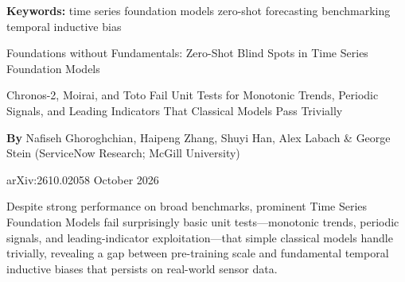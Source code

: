 \documentclass[10pt,twocolumn]{article}
\begin{document}
\setlength{\parindent}{0pt}
\setlength{\parskip}{4pt}

{\small\color{keywordgray}\textbf{Keywords:}
  time series foundation models \textbullet{}
  zero-shot forecasting \textbullet{}
  benchmarking \textbullet{}
  temporal inductive bias}\par\vspace{4pt}

{\LARGE\bfseries\raggedright
  Foundations without Fundamentals: Zero-Shot Blind Spots in Time Series Foundation Models}\par\vspace{4pt}

{\large\itshape\raggedright
  Chronos-2, Moirai, and Toto Fail Unit Tests for Monotonic Trends, Periodic Signals,
  and Leading Indicators That Classical Models Pass Trivially}\par\vspace{6pt}

{\small\textbf{By} Nafiseh Ghoroghchian, Haipeng Zhang, Shuyi Han,
  Alex Labach \& George Stein (ServiceNow Research; McGill University)}\par\vspace{2pt}

{\small\color{keywordgray}arXiv:2610.02058 \textbullet{} October 2026}
\par\vspace{2pt}\noindent{\color{rulered}\rule{\columnwidth}{0.6pt}}\vspace{6pt}

Despite strong performance on broad benchmarks, prominent Time Series Foundation Models
fail surprisingly basic unit tests---monotonic trends, periodic signals, and leading-indicator
exploitation---that simple classical models handle trivially, revealing a gap between
pre-training scale and fundamental temporal inductive biases that persists on real-world
sensor data.
\end{document}
